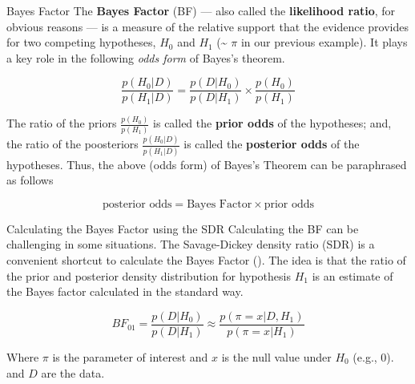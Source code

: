 \documentclass[
  ignorenonframetext,
]{beamer}
\begin{document}
\begin{frame}{Bayes Factor}
\label{bayes-factor-3}
The \textbf{Bayes Factor} (BF) --- also called the \textbf{likelihood
ratio}, for obvious reasons --- is a measure of the relative support
that the evidence provides for two competing hypotheses, \(H_0\) and
\(H_1\) (\textasciitilde{} \(\pi\) in our previous example). It plays a
key role in the following \emph{odds form} of Bayes's theorem.

\[
\frac{p(H_0|D)}{p(H_1|D)} = \frac{p(D|H_0)}{p(D|H_1)} \times \frac{p(H_0)}{p(H_1)}
\]

The ratio of the priors \(\frac{p(H_0)}{p(H_1)}\) is called the
\textbf{prior odds} of the hypotheses; and, the ratio of the poosteriors
\(\frac{p(H_0| D)}{p(H_1 | D)}\) is called the \textbf{posterior odds}
of the hypotheses. Thus, the above (odds form) of Bayes's Theorem can be
paraphrased as follows

\[
\text{posterior odds} = \text{Bayes Factor} \times \text{prior odds}
\]
\end{frame}

\begin{frame}{Calculating the Bayes Factor using the SDR}
\label{calculating-the-bayes-factor-using-the-sdr}
Calculating the BF can be challenging in some situations. The
Savage-Dickey density ratio (SDR) is a convenient shortcut to calculate
the Bayes Factor (). The idea is that the ratio of the prior and posterior density
distribution for hypothesis \(H_1\) is an estimate of the Bayes factor
calculated in the standard way.

\[
BF_{01} = \frac{p(D|H_0)}{p(D|H_1)} \approx \frac{p(\pi = x|D, H_1)}{p(\pi = x | H_1)}
\]

Where \(\pi\) is the parameter of interest and \(x\) is the null value
under \(H_0\) (e.g., 0). and \(D\) are the data.
\end{frame}
\end{document}
